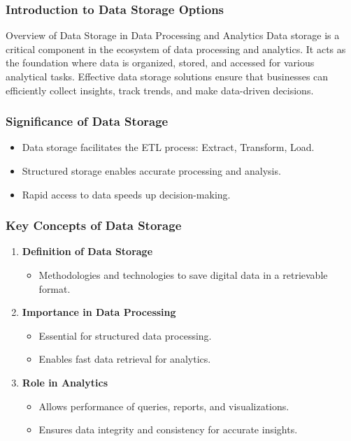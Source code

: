 \documentclass[aspectratio=169]{beamer}
\begin{document}
\frame{\titlepage}

\begin{frame}[fragile]
    \frametitle{Introduction to Data Storage Options}
    \begin{block}{Overview of Data Storage in Data Processing and Analytics}
        Data storage is a critical component in the ecosystem of data processing and analytics. It acts as the foundation where data is organized, stored, and accessed for various analytical tasks. Effective data storage solutions ensure that businesses can efficiently collect insights, track trends, and make data-driven decisions.
    \end{block}
\end{frame}

\begin{frame}[fragile]
    \frametitle{Significance of Data Storage}
    \begin{itemize}
        \item Data storage facilitates the ETL process: Extract, Transform, Load.
        \item Structured storage enables accurate processing and analysis.
        \item Rapid access to data speeds up decision-making.
    \end{itemize}
\end{frame}

\begin{frame}[fragile]
    \frametitle{Key Concepts of Data Storage}
    \begin{enumerate}
        \item \textbf{Definition of Data Storage}
            \begin{itemize}
                \item Methodologies and technologies to save digital data in a retrievable format.
            \end{itemize}
            
        \item \textbf{Importance in Data Processing}
            \begin{itemize}
                \item Essential for structured data processing.
                \item Enables fast data retrieval for analytics.
            \end{itemize}
        
        \item \textbf{Role in Analytics}
            \begin{itemize}
                \item Allows performance of queries, reports, and visualizations.
                \item Ensures data integrity and consistency for accurate insights.
            \end{itemize}
    \end{enumerate}
\end{frame}
\end{document}
